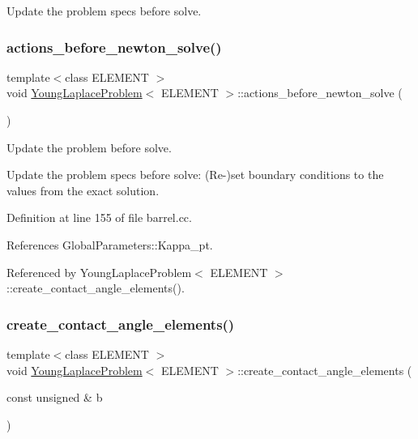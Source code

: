 Update the problem specs before solve. 

\mbox{\label{classYoungLaplaceProblem_a93dd45313d28c3b9b0b51e34d14ebd24}} 
\subsubsection{\texorpdfstring{actions\+\_\+before\+\_\+newton\+\_\+solve()}{actions\_before\_newton\_solve()}\hspace{0.1cm}{\footnotesize\ttfamily [2/2]}}
{\footnotesize\ttfamily template$<$class E\+L\+E\+M\+E\+NT $>$ \\
void \hyperlink{classYoungLaplaceProblem}{Young\+Laplace\+Problem}$<$ E\+L\+E\+M\+E\+NT $>$\+::actions\+\_\+before\+\_\+newton\+\_\+solve (\begin{DoxyParamCaption}{ }\end{DoxyParamCaption})\hspace{0.3cm}{\ttfamily [inline]}}



Update the problem before solve. 

Update the problem specs before solve\+: (Re-\/)set boundary conditions to the values from the exact solution. 

Definition at line 155 of file barrel.\+cc.



References Global\+Parameters\+::\+Kappa\+\_\+pt.



Referenced by Young\+Laplace\+Problem$<$ E\+L\+E\+M\+E\+N\+T $>$\+::create\+\_\+contact\+\_\+angle\+\_\+elements().

\mbox{\label{classYoungLaplaceProblem_a3ebbc17f9f27480e720f0bd87a036a12}} 
\subsubsection{\texorpdfstring{create\+\_\+contact\+\_\+angle\+\_\+elements()}{create\_contact\_angle\_elements()}}
{\footnotesize\ttfamily template$<$class E\+L\+E\+M\+E\+NT $>$ \\
void \hyperlink{classYoungLaplaceProblem}{Young\+Laplace\+Problem}$<$ E\+L\+E\+M\+E\+NT $>$\+::create\+\_\+contact\+\_\+angle\+\_\+elements (\begin{DoxyParamCaption}\item[{const unsigned \&}]{b }\end{DoxyParamCaption})\hspace{0.3cm}{\ttfamily [private]}}



